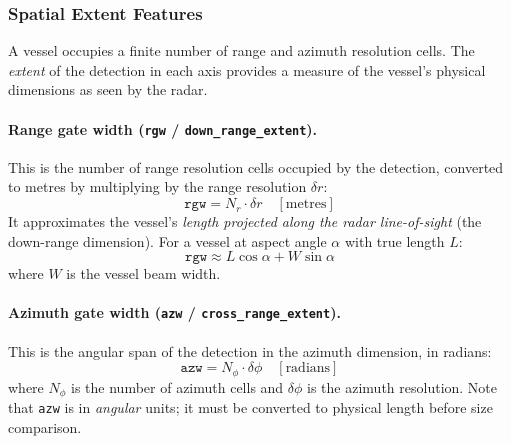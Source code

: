 \documentclass[12pt, a4paper]{article}
\begin{document}
\subsubsection{Spatial Extent Features}
\label{sec:size_features}

A vessel occupies a finite number of range and azimuth resolution cells.
The \emph{extent} of the detection in each axis provides a measure of the
vessel's physical dimensions as seen by the radar.

\paragraph{Range gate width (\texttt{rgw} / \texttt{down\_range\_extent}).}
This is the number of range resolution cells occupied by the detection, converted
to metres by multiplying by the range resolution $\delta r$:
\begin{equation}
    \texttt{rgw} = N_r \cdot \delta r \quad [\text{metres}]
\end{equation}
It approximates the vessel's \emph{length projected along the radar line-of-sight}
(the down-range dimension). For a vessel at aspect angle $\alpha$ with true
length $L$:
\begin{equation}
    \texttt{rgw} \approx L \cos\alpha + W \sin\alpha
\end{equation}
where $W$ is the vessel beam width.

\paragraph{Azimuth gate width (\texttt{azw} / \texttt{cross\_range\_extent}).}
This is the angular span of the detection in the azimuth dimension, in radians:
\begin{equation}
    \texttt{azw} = N_\phi \cdot \delta\phi \quad [\text{radians}]
\end{equation}
where $N_\phi$ is the number of azimuth cells and $\delta\phi$ is the azimuth
resolution. Note that \texttt{azw} is in \emph{angular} units; it must be
converted to physical length before size comparison.
\end{document}
